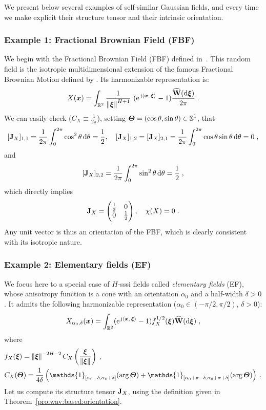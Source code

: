 \documentclass{elsarticle}
\def\S{\mbox{$\mathbb{S}$}}
\begin{document}
We present below several examples of self-similar Gaussian fields, and every time we make explicit their structure tensor and their intrinsic orientation. 

\subsubsection{Example 1: Fractional Brownian Field (FBF)\\}\label{s:wav:based:orientation:ssi:ex1}

We begin with the Fractional Brownian Field (FBF) defined in~\cite{Lind93}. This random field is the isotropic multidimensional extension of the famous Fractional Brownian Motion defined by \cite{MVN68}. 
Its harmonizable representation is:
\[
X(\bm{x})=\int_{\mathbb{R}^2} \frac{1}{\left\lVert\bm{\xi}\right\rVert^{H+1}} ~(\mathrm{e}^{\, \mathrm{j} \left \langle \bm{x},\, \bm{\xi}\right \rangle}-1)\frac{\mathbf{\widehat{W}}(\mathop{}\mathopen{}\mathrm{d} \bm{\xi})}{2\pi}\;.
\]
We can easily check ($C_X\equiv \frac{1}{2\pi}$), setting $\vect{\Theta}=(\cos \theta, \sin \theta) \in \S^1$, that
\[
[\mathbf{J}_X]_{1,1}= \frac{1}{2\pi}\int_0^{2\pi}\cos^2 \theta\mathop{}\mathopen{}\mathrm{d} \theta= \frac{1}{2},
\quad [\mathbf{J}_X]_{1,2}=[\mathbf{J}_X]_{2,1}= \frac{1}{2\pi}\int_0^{2\pi}\cos \theta \sin \theta\mathop{}\mathopen{}\mathrm{d} \theta=0\;, 
\]
and
\[
[\mathbf{J}_X]_{2,2}= \frac{1}{2\pi}\int_0^{2\pi}\sin^2 \theta\mathop{}\mathopen{}\mathrm{d} \theta= \frac{1}{2}\;,
\]
which directly implies
\[
\mathbf{J}_X=\begin{pmatrix}\frac{1}{2} & 0 \\ 0 &\frac{1}{2}\end{pmatrix},\quad \chi(X)=0\;.
\]
Any unit vector is thus an orientation of the FBF, which is clearly consistent with its isotropic nature.
\subsubsection{Example 2: Elementary fields (EF)\\}\label{s:wav:based:orientation:ssi:ex2}

 We focus here to a special case of $H$-sssi fields called {\it elementary fields} (EF), whose anisotropy function is a cone with an orientation $\alpha_0$ and a half-width $\delta>0$. It admits the following harmonizable representation
($\alpha_0\in (-\pi/2,\pi/2)$, $\delta >0$):
\begin{equation}
\label{eq:lafbf}
X_{\alpha_0,\delta}(\bm{x})=\int_{\mathbb{R}^2} (\mathrm{e}^{\, \mathrm{j} \left \langle \bm{x},\, \bm{\xi}\right \rangle}-1)f_X^{1/2}(\bm{\xi})\widehat{\mathbf{W}}(\mathop{}\mathopen{}\mathrm{d} \bm{\xi})\;,
\end{equation}
where 
\begin{align}
\label{eq:elementary}
&f_X(\vect{\xi})=\norme{\vect{\xi}}^{-2H-2}C_X\left(\frac{\vect{\xi}}{\norme{\vect{\xi}}}\right)\;,\\
&C_X(\vect{\Theta})=\frac{1}{4\delta}\left(\mathds{1}_{[\alpha_0-\delta,\alpha_0+\delta]}(\arg \vect{\Theta})+\mathds{1}_{[\alpha_0+\pi-\delta,\alpha_0+\pi+\delta]}(\arg \vect{\Theta})\right)\;.\label{eq:CXcone}
\end{align}
Let us compute its structure tensor $\mathbf{J}_X$, using the definition given in Theorem~\ref{pro:wav:based:orientation}.
\end{document}
